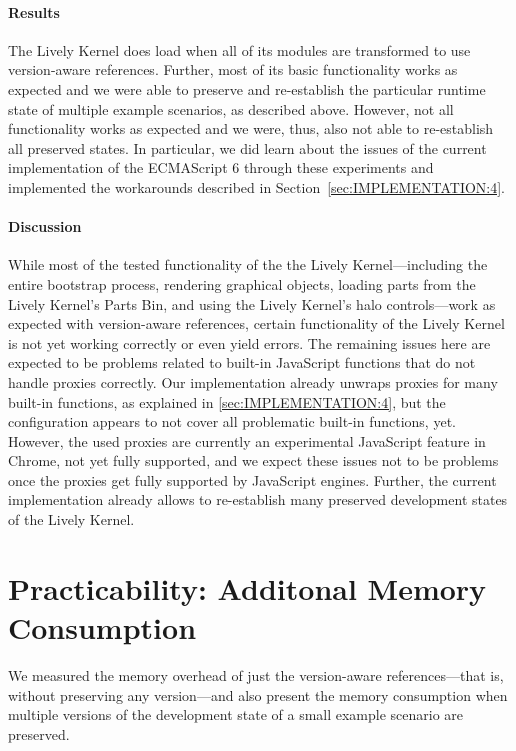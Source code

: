 \paragraph{Results}
The Lively Kernel does load when all of its modules are transformed to use version-aware references.
Further, most of its basic functionality works as expected and we were able to preserve and re-establish the particular runtime state of multiple example scenarios, as described above.
However, not all functionality works as expected and we were, thus, also not able to re-establish all preserved states. 
In particular, we did learn about the issues of the current implementation of the ECMAScript 6 through these experiments and implemented the workarounds described in Section~\ref{sec:IMPLEMENTATION:4}.

\paragraph{Discussion}
While most of the tested functionality of the the Lively Kernel---including the entire bootstrap process, rendering graphical objects, loading parts from the Lively Kernel's Parts Bin, and using the Lively Kernel's halo controls---work as expected with version-aware references, certain functionality of the Lively Kernel is not yet working correctly or even yield errors.
The remaining issues here are expected to be problems related to built-in JavaScript functions that do not handle proxies correctly.
Our implementation already unwraps proxies for many built-in functions, as explained in \ref{sec:IMPLEMENTATION:4}, but the configuration appears to not cover all problematic built-in functions, yet.
However, the used proxies are currently an experimental JavaScript feature in Chrome, not yet fully supported, and we expect these issues not to be problems once the proxies get fully supported by JavaScript engines.
Further, the current implementation already allows to re-establish many preserved development states of the Lively Kernel.




\section{Practicability: Additonal Memory Consumption} \label{sec:DISCUSSION:2}

We measured the memory overhead of just the version-aware references---that is, without preserving any version---and also present the memory consumption when multiple versions of the development state of a small example scenario are preserved.


